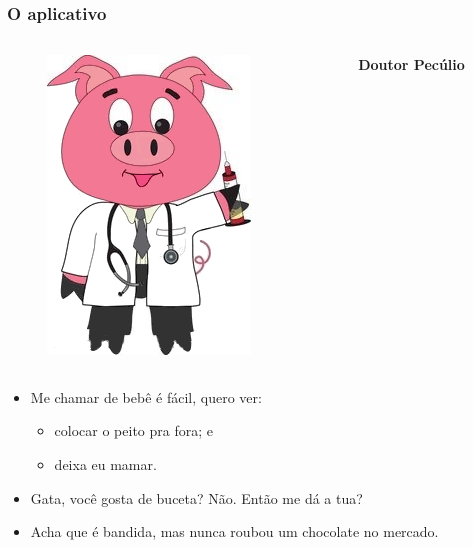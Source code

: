 \documentclass[14pt,beamer]{beamer}
\begin{document}
\begin{frame}
	\frametitle{O aplicativo}
	
	\vspace{-30px}
	\begin{columns}
		\begin{column}{.3\textwidth}
			\begin{figure}
				\includegraphics[scale=.15]{imagens/docpig}
			\end{figure}
		\end{column}%
		\hfill%
		\begin{column}{9\textwidth}
			\large{\textbf{Doutor Pecúlio}}
		\end{column}%
	\end{columns}
	
	\vspace{10px}
	\begin{itemize}
		\item Me chamar de bebê é fácil, quero ver:
			\begin{itemize}
				\item colocar o peito pra fora; e
				\item deixa eu mamar. 	
			\end{itemize}
		\item Gata, você gosta de buceta? Não. Então me dá a tua?
		\item Acha que é bandida, mas nunca roubou um chocolate no mercado.
	\end{itemize}
\end{frame}

\end{document}

